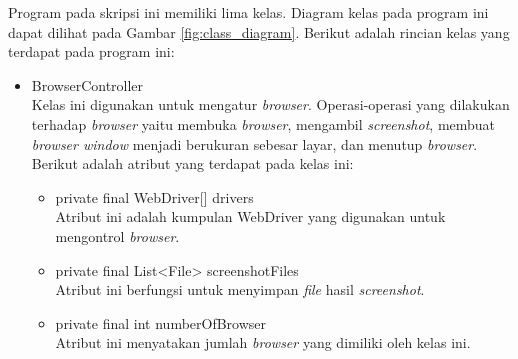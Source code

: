 Program pada skripsi ini memiliki lima kelas. Diagram kelas pada program ini dapat dilihat pada Gambar \ref{fig:class_diagram}. Berikut adalah rincian kelas yang terdapat pada program ini:
\begin{itemize}
\item BrowserController\\
Kelas ini digunakan untuk mengatur \textit{browser}. Operasi-operasi yang dilakukan terhadap \textit{browser} yaitu membuka \textit{browser}, mengambil \textit{screenshot}, membuat \textit{browser window} menjadi berukuran sebesar layar, dan menutup \textit{browser}. Berikut adalah atribut yang terdapat pada kelas ini:
\begin{itemize}
   \item private final WebDriver[] drivers\\
   Atribut ini adalah kumpulan WebDriver yang digunakan untuk mengontrol \textit{browser}. 
    \item private final List<File> screenshotFiles\\
	Atribut ini berfungsi untuk menyimpan \textit{file} hasil \textit{screenshot}.
	\item  private final int numberOfBrowser\\
	Atribut ini menyatakan jumlah \textit{browser} yang dimiliki oleh kelas ini.
\end{itemize}


\end{itemize}

